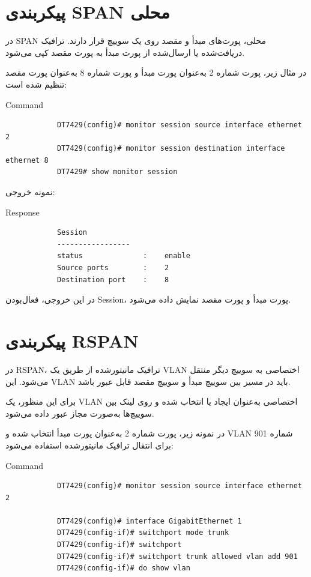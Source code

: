 \documentclass[11pt,letterpaper]{report}
\begin{document}
	\section{پیکربندی SPAN محلی}

	در SPAN محلی، پورت‌های مبدأ و مقصد روی یک سوییچ قرار دارند.
	ترافیک دریافت‌شده یا ارسال‌شده از پورت مبدأ به پورت مقصد کپی می‌شود.

	در مثال زیر، پورت شماره 2 به‌عنوان پورت مبدأ و پورت شماره 8
	به‌عنوان پورت مقصد تنظیم شده است:

	\begin{latin}
		\begin{cliexample}{Command}
			\begin{verbatim}
			DT7429(config)# monitor session source interface ethernet 2
			DT7429(config)# monitor session destination interface ethernet 8
			DT7429# show monitor session
			\end{verbatim}
		\end{cliexample}
	\end{latin}

	نمونه خروجی:

	\begin{latin}
		\begin{cliexample}{Response}
			\begin{verbatim}
			Session
			-----------------
			status              :    enable
			Source ports        :    2
			Destination port    :    8
			\end{verbatim}
		\end{cliexample}
	\end{latin}

	در این خروجی، فعال‌بودن Session، پورت مبدأ و پورت مقصد نمایش داده
	می‌شود.


	\section{پیکربندی RSPAN}

	در RSPAN، ترافیک مانیتور‌شده از طریق یک VLAN اختصاصی به سوییچ
	دیگر منتقل می‌شود. این VLAN باید در مسیر بین سوییچ مبدأ و سوییچ
	مقصد قابل عبور باشد.

	برای این منظور، یک VLAN اختصاصی به‌عنوان
	 ایجاد یا انتخاب شده و روی لینک بین سوییچ‌ها
	به‌صورت مجاز عبور داده می‌شود.

	در نمونه زیر، پورت شماره 2 به‌عنوان پورت مبدأ انتخاب شده و
	VLAN شماره 901 برای انتقال ترافیک مانیتور‌شده استفاده می‌شود:

	\begin{latin}
		\begin{cliexample}{Command}
			\begin{verbatim}
			DT7429(config)# monitor session source interface ethernet 2

			DT7429(config)# interface GigabitEthernet 1
			DT7429(config-if)# switchport mode trunk
			DT7429(config-if)# switchport
			DT7429(config-if)# switchport trunk allowed vlan add 901
			DT7429(config-if)# do show vlan
			\end{verbatim}
		\end{cliexample}
	\end{latin}
\end{document}

